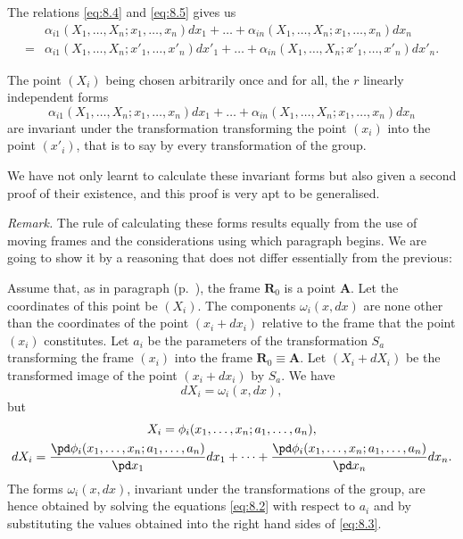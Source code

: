 The relations \eqref{eq:8.4} and \eqref{eq:8.5} gives us
\begin{align*}
  &{}\alpha_{i1}(X_{1},\dots,X_{n};x_{1},\dots,x_{n})dx_{1}+\dots+\alpha_{in}(X_{1},\dots,X_{n};x_{1},\dots,x_{n})dx_{n}\\
  {}={}&{}\alpha_{i1}(X_{1},\dots,X_{n};x'_{1},\dots,x'_{n}) dx'_{1}+\dots+\alpha_{in}(X_{1},\dots,X_{n};x'_{1},\dots,x'_{n})dx'_{n}.
\end{align*}

The point $(X_{i})$ being chosen arbitrarily once and for all, the $r$ linearly independent forms
\[
\alpha_{i 1}(X_{1},\dots,X_{n};x_{1},\dots,x_{n})dx_{1}+\dots+\alpha_{in}(X_{1},\dots,X_{n};x_{1},\dots,x_{n})dx_{n}
\]
are invariant under the transformation transforming the point $(x_{i})$ into the point $(x'_{i})$, that is to say by every transformation of the group.

We have not only learnt to calculate these invariant forms but also given a second proof of their existence, and this proof is very apt to be generalised.

\somespace

\emph{Remark.} The rule of calculating these forms results equally from the use of moving frames and the considerations using which paragraph  begins. We are going to show it by a reasoning that does not differ essentially from the previous:

Assume that, as in paragraph  (p.~\pageref{sec:99}), the frame $\mathbf{R}_{0}$ is a point $\mathbf{A}$. Let the coordinates of this point be $(X_{i})$. The components $\omega_{i}(x,dx)$ are none other than the coordinates of the point $(x_{i}+dx_{i})$ relative to the frame that the point $(x_{i})$ constitutes. Let $a_{i}$ be the parameters of the transformation $S_{a}$ transforming the frame $(x_{i})$ into the frame $\mathbf{R}_{0}\equiv \mathbf{A}$. Let $(X_{i}+dX_{i})$ be the transformed image of the point $(x_{i}+dx_{i})$ by $S_{a}$. We have
\[
dX_{i}=\omega_{i}(x,dx),
\]
but
\begin{gather*}  
  X_{i}=\phi_{i}(x_{1},\dots,x_{n};a_{1},\dots,a_{n}),\\
  dX_{i}=\frac{\pd \phi_{i}(x_{1},\dots,x_{n};a_{1},\dots,a_{n})}{\pd x_{1}}dx_{1}+\dots+\frac{\pd \phi_{i}(x_{1},\dots,x_{n};a_{1},\dots,a_{n})}{\pd x_{n}}dx_{n}.
\end{gather*}
The forms $\omega_{i}(x,dx)$, invariant under the transformations of the group, are hence obtained by solving the equations \eqref{eq:8.2} with respect to $a_{i}$ and by substituting the values obtained into the right hand sides of \eqref{eq:8.3}.

